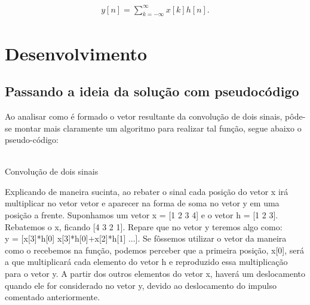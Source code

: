 \documentclass[dvipdfm, a4paper, 11pt]{report}
\begin{document}
{\begin{gather*}
y[n] = \sum_{k=-\infty}^\infty x[k]h[n].
\end{gather*}

\chapter{Desenvolvimento}\label{desenv}

\section{Passando a ideia da solução com pseudocódigo}
Ao analisar como é formado o vetor resultante da convolução de dois sinais, pôde-se montar mais claramente um algoritmo para realizar tal função, segue abaixo o pseudo-código:\\
\\
\begin{algorithm}[H]
 \caption{Convolução de dois sinais}
\end{algorithm}
Explicando de maneira sucinta, ao rebater o sinal cada posição do vetor x irá multiplicar no vetor vetor e aparecer na forma de soma no vetor y em uma posição a frente. Suponhamos um vetor x = [1 2 3 4] e o vetor h = [1 2 3]. Rebatemos o x, ficando [4 3 2 1]. Repare que no vetor y teremos algo como:\\
y = [x[3]*h[0] x[3]*h[0]+x[2]*h[1] ...]. Se fôssemos utilizar o vetor da maneira como o recebemos na função, podemos perceber que a primeira posição, x[0], será a que multiplicará cada elemento do vetor h e reproduzido essa multiplicação para o vetor y. A partir dos outros elementos do vetor x, haverá um deslocamento quando ele for considerado no vetor y, devido ao deslocamento do impulso comentado anteriormente.
\newpage
}
\end{document}
